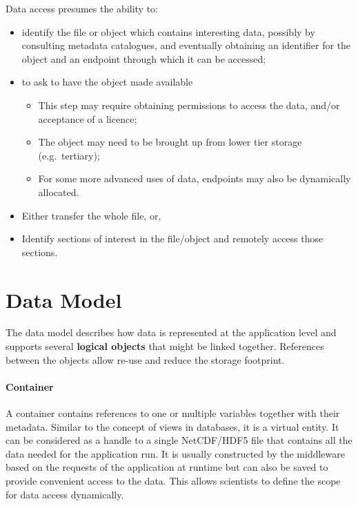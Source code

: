 \documentclass{../../template/esiwace-report}
\begin{document}
Data access presumes the ability to:
\begin{itemize}
\item identify the file or object which contains interesting data, possibly by consulting metadata catalogues, and
  eventually obtaining an identifier for the object and an endpoint through which it can be accessed;
\item to ask to have the object made available
  \begin{itemize}
  \item This step may require obtaining permissions to access the data, and/or acceptance of a licence;
  \item The object may need to be brought up from lower tier storage (e.g.\ tertiary);
  \item For some more advanced uses of data, endpoints may also be dynamically allocated.
  \end{itemize}
\item Either transfer the whole file, or,
\item Identify sections of interest in the file/object and remotely access those sections.
\end{itemize}




\section{Data Model}

The data model describes how data is represented at the application level and supports several \textbf{logical objects} that might be linked together.
References between the objects allow re-use and reduce the storage footprint.

\paragraph{Container}
A container contains references to one or multiple variables together with their metadata.
Similar to the concept of views in databases, it is a virtual entity.
It can be considered as a handle to a single NetCDF/HDF5 file that contains all the data needed for the application run.
It is usually constructed by the middleware based on the requests of the application at runtime but can also be saved to provide convenient access to the data.
This allows scientists to define the scope for data access dynamically.
\end{document}
